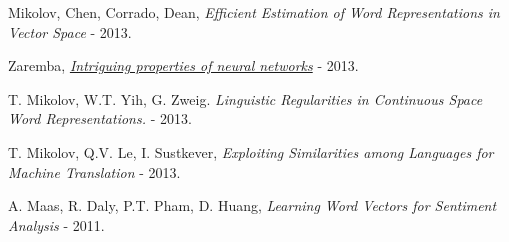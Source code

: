 \documentclass[12pt]{article}
\begin{document}
\begin{thebibliography}{20}
   Mikolov, Chen, Corrado, Dean,
  {\em Efficient Estimation of Word Representations in Vector Space} - 2013.

   Zaremba, \href{http://cs.nyu.edu/~zaremba/docs/understanding.pdf}
  {{\em Intriguing properties of neural networks}} - 2013.

   T. Mikolov, W.T. Yih, G. Zweig.
  {\em Linguistic Regularities in Continuous Space Word Representations.} - 2013.

   T. Mikolov, Q.V. Le, I. Sustkever,
  {\em Exploiting Similarities among Languages for Machine Translation} - 2013.

   A. Maas, R. Daly, P.T. Pham, D. Huang, {\em Learning Word Vectors for Sentiment Analysis} - 2011.

\end{thebibliography}
\end{document}

